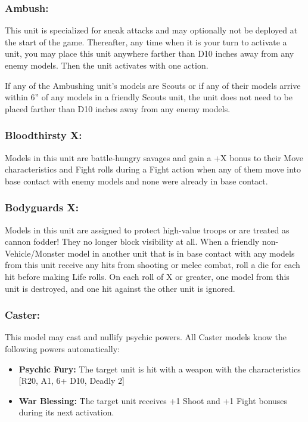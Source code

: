 \begin{multicols}{2}
\subsubsection*{Ambush:} This unit is specialized for sneak attacks and may optionally not be deployed at the start of the game. Thereafter, any time when it is your turn to activate a unit, you may place this unit anywhere farther than D10 inches away from any enemy models. Then the unit activates with one action.

If any of the Ambushing unit's models are Scouts or if any of their models arrive within 6'' of any models in a friendly Scouts unit, the unit does not need to be placed farther than D10 inches away from any enemy models.

\subsubsection*{Bloodthirsty X:} Models in this unit are battle-hungry savages and gain a +X bonus to their Move characteristics and Fight rolls during a Fight action when any of them move into base contact with enemy models and none were already in base contact.

\subsubsection*{Bodyguards X:} Models in this unit are assigned to protect high-value troops or are treated as cannon fodder! They no longer block visibility at all. When a friendly non-Vehicle/Monster model in another unit that is in base contact with any models from this unit receive any hits from shooting or melee combat, roll a die for each hit before making Life rolls. On each roll of X or greater, one model from this unit is destroyed, and one hit against the other unit is ignored.

\subsubsection*{Caster:} This model may cast and nullify psychic powers. All Caster models know the following powers automatically:

\begin{itemize}
    \item \textbf{Psychic Fury:} The target unit is hit with a weapon with the characteristics [R20, A1, 6+ D10, Deadly 2]
    \item \textbf{War Blessing:} The target unit receives +1 Shoot and +1 Fight bonuses during its next activation.
\end{itemize}


\end{multicols}

